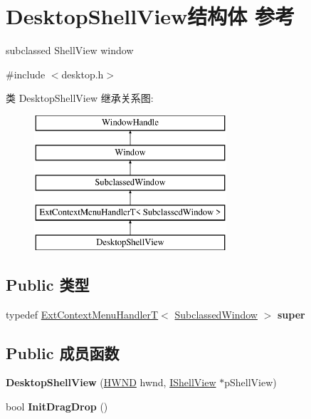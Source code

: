\hypertarget{struct_desktop_shell_view}{}\section{Desktop\+Shell\+View结构体 参考}
\label{struct_desktop_shell_view}


subclassed Shell\+View window  




{\ttfamily \#include $<$desktop.\+h$>$}

类 Desktop\+Shell\+View 继承关系图\+:\begin{figure}[H]
\begin{center}
\leavevmode
\includegraphics[height=5.000000cm]{struct_desktop_shell_view}
\end{center}
\end{figure}
\subsection*{Public 类型}
\begin{DoxyCompactItemize}
\item 
\mbox{\label{struct_desktop_shell_view_a17dabdf28bb281a6f9686a8dc5872c05}} 
typedef \hyperlink{struct_ext_context_menu_handler_t}{Ext\+Context\+Menu\+HandlerT}$<$ \hyperlink{struct_subclassed_window}{Subclassed\+Window} $>$ {\bfseries super}
\end{DoxyCompactItemize}
\subsection*{Public 成员函数}
\begin{DoxyCompactItemize}
\item 
\mbox{\label{struct_desktop_shell_view_a79003b85e20e256bccc31715b33e5320}} 
{\bfseries Desktop\+Shell\+View} (\hyperlink{interfacevoid}{H\+W\+ND} hwnd, \hyperlink{interface_i_shell_view}{I\+Shell\+View} $\ast$p\+Shell\+View)
\item 
\mbox{\label{struct_desktop_shell_view_a8b7182bfb30c7fab7be37df3d7569beb}} 
bool {\bfseries Init\+Drag\+Drop} ()
\end{DoxyCompactItemize}
